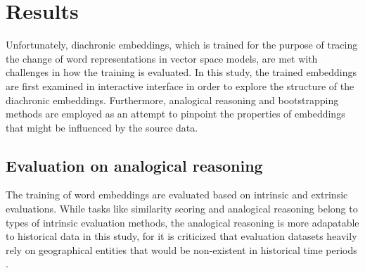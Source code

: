 

\chapter{Results}

Unfortunately, diachronic embeddings, which is trained for the purpose of tracing the change of word representations in vector space models, are met with challenges in how the training is evaluated. In this study, the trained embeddings are first examined in interactive interface in order to explore the structure of the diachronic embeddings. Furthermore, analogical reasoning and bootstrapping methods are employed as an attempt to pinpoint the properties of embeddings that might be influenced by the source data.

\section{Evaluation on analogical reasoning}

The training of word embeddings are evaluated based on intrinsic and extrinsic evaluations. While tasks like similarity scoring and analogical reasoning belong to types of intrinsic evaluation methods, the analogical reasoning is more adapatable to historical data in this study, for it is criticized that evaluation datasets heavily rely on geographical entities that would be non-existent in historical time periods \parencite{wevers2020digital,li2018analogical}.

